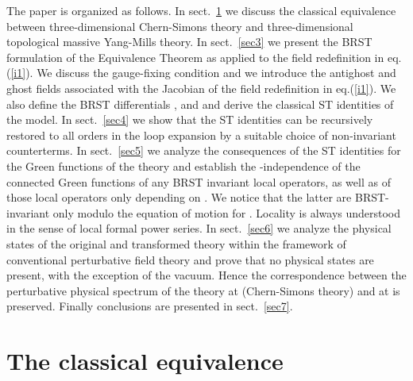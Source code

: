 \documentclass[a4paper,11pt]{article}
\begin{document}
The paper is organized as follows.
In sect.~\ref{sec2} we discuss the classical equivalence
between three-dimensional Chern-Simons theory and three-dimensional
topological massive Yang-Mills theory.
In sect.~\ref{sec3} we present the BRST formulation of the
Equivalence Theorem as applied to the field redefinition in eq.(\ref{i1}).
We discuss the gauge-fixing condition and we introduce the
antighost and ghost fields \coordHE{} associated
with the Jacobian of the field redefinition in eq.(\ref{i1}).
We also define the BRST differentials \coordHE{}, \myHighlight{$\delta$}\coordHE{} and \coordHE{} and
derive the classical ST identities of the model.
In sect.~\ref{sec4} we show that the ST identities can be recursively restored
to all orders in the loop expansion by a suitable choice of non-invariant
counterterms. In sect.~\ref{sec5} we analyze the consequences of the
ST identities for the Green functions of the theory and establish
the \myHighlight{$\lambda$}\coordHE{}-independence of the connected Green functions of any BRST 
invariant local operators, as well as of  those local
operators only depending on \coordHE{}. 
We notice that the latter are BRST-invariant only modulo the equation of motion
for \coordHE{}. Locality is always understood in the sense of local formal power
series.
In sect.~\ref{sec6} we analyze the physical states
of the original and transformed theory within the framework
of conventional perturbative field theory and prove that
no physical states are present, with the exception of the vacuum.
Hence the correspondence between the perturbative physical spectrum of
the theory at \coordHE{} (Chern-Simons theory) and at
\coordHE{} is preserved.
%
Finally conclusions are presented in sect.~\ref{sec7}.

\section{The classical equivalence}\label{sec2}
\end{document}
